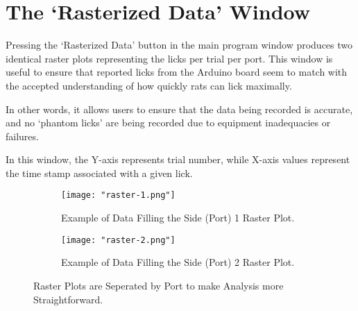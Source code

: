 \documentclass{article}
\begin{document}
\clearpage
\section{The `Rasterized Data' Window}
\label{sec:rasterized-data-window}
Pressing the `Rasterized Data' button in  the main program window produces two identical raster plots representing the licks per trial per port. This window is useful to 
ensure that reported licks from the Arduino board seem to match with the accepted understanding of how quickly rats can lick maximally. 

In other words, it allows users to
ensure that the data being recorded is accurate, and no `phantom licks' are being recorded due to equipment inadequacies or failures.

In this window, the Y-axis represents trial number, while X-axis values represent the time stamp associated with a given lick.

\begin{figure}[h!]
    \centering
    \begin{subfigure}[t]{.45\textwidth}
        \centering
        \texttt{[image: "raster-1.png"]}
        \caption{Example of Data Filling the Side (Port) 1 Raster Plot.}
        \label{fig:raster-1}
    \end{subfigure}
    \hfill
    \begin{subfigure}[t]{.45\textwidth}
        \centering
        \texttt{[image: "raster-2.png"]}
        \caption{Example of Data Filling the Side (Port) 2 Raster Plot.}
        \label{fig:raster-2}
    \end{subfigure}
    \caption{Raster Plots are Seperated by Port to make Analysis more Straightforward.}
    \label{fig:rasters}
\end{figure}
\end{document}
